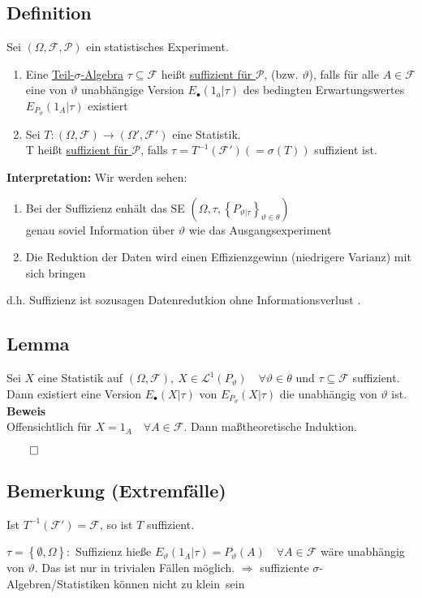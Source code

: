 \documentclass[german,10pt,oneside, fleqn, a4paper]{article}
\newcommand{\Ra}	{\Rightarrow}
\newcommand{\ra}{\rightarrow}
\newcommand{\brac}[1]{\left\lbrace #1\right\rbrace}
\newcommand{\QED}{\begin{flushright}$\qed$\end{flushright}}
\newcommand{\mc}[1]{\mathcal{#1}}
\newcommand{\lp}[1]{\mc{L}^{#1}}
\newcommand{\beweis}{\textbf{Beweis}\\}
\newcommand{\1}[1]{1_{#1}}
\newcommand{\2}[1]{\1{\brac{#1}}}
\newcommand{\f}{\mc{F}}
\newcommand{\p}{\mc{P}}
\begin{document}
\subsection{Definition}
\label{10.2}
Sei $(\Omega,\f,\p)$ ein statistisches Experiment.\begin{enumerate}[label=(\alph*)]
\item Eine \underline{Teil-$\sigma$-Algebra} $\tau\subseteq\f$ heißt \underline{suffizient für $\p$}, (bzw. $\vartheta$), falls für alle $A\in\f$ eine von $\vartheta$ unabhängige Version $E_\bullet(1_a|\tau)$ des bedingten Erwartungswertes $E_{P_\vartheta}(1_A|\tau)$ existiert
\item Sei $T:(\Omega,\f)\ra(\Omega',\f')$ eine Statistik.\\
T heißt \underline{suffizient für $\p$}, falls $\tau=T^{-1}(\f')(=\sigma(T))$ suffizient ist.\\
\end{enumerate}

\textbf{Interpretation:}
Wir werden sehen:\begin{enumerate}
\item Bei der Suffizienz enhält das SE $(\Omega, \tau, \brac{P_{\vartheta|\tau}}_{\vartheta\in\theta})$ \\genau soviel Information über $\vartheta$ wie das Ausgangsexperiment
\item Die Reduktion der Daten wird einen Effizienzgewinn (niedrigere Varianz) mit sich bringen
\end{enumerate}
d.h. Suffizienz ist sozusagen \glqq Datenredutkion ohne Informationsverlust \grqq.


\subsection{Lemma}
\label{10.3}
Sei $X$ eine Statistik auf $(\Omega,\f),\ X\in\lp{1}(P_\vartheta)\quad \forall\vartheta\in\theta$ und $\tau\subseteq\f$ suffizient.\\
Dann existiert eine Version $E_\bullet(X|\tau)$ von $E_{P_\vartheta}(X|\tau)$ die unabhängig von $\vartheta$ ist.\\
\beweis
Offensichtlich für $X=1_A\quad\forall A\in\f$. Dann maßtheoretische Induktion.\QED

\subsection{Bemerkung (Extremfälle)}
\label{10.4}
\begin{list}{•}{}
\item Ist $T^{-1}(\f')=\f$, so ist $T$ suffizient.
\item $\tau=\brac{\emptyset,\Omega}:$ Suffizienz hieße $E_\vartheta(1_A|\tau)=P_\vartheta(A)\quad\forall A\in\f$ wäre unabhängig von $\vartheta$. Das ist nur in trivialen Fällen möglich.
$\Ra$ suffiziente $\sigma$-Algebren/Statistiken können nicht \glqq zu klein\grqq\ sein
\end{list}
\end{document}
